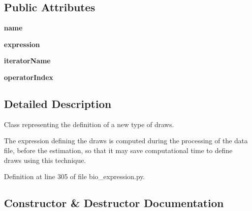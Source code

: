 \subsection*{Public Attributes}
\begin{DoxyCompactItemize}
\item 
{\bfseries name}\hypertarget{classbio__expression_1_1_define_draws_a6fbf82da29bb54a8f52993add976814d}{}\label{classbio__expression_1_1_define_draws_a6fbf82da29bb54a8f52993add976814d}

\item 
{\bfseries expression}\hypertarget{classbio__expression_1_1_define_draws_a40611dcf70a07654b7fff1fb6e52daa9}{}\label{classbio__expression_1_1_define_draws_a40611dcf70a07654b7fff1fb6e52daa9}

\item 
{\bfseries iterator\+Name}\hypertarget{classbio__expression_1_1_define_draws_af0551e32bbb64f399304bc800e2473eb}{}\label{classbio__expression_1_1_define_draws_af0551e32bbb64f399304bc800e2473eb}

\item 
{\bfseries operator\+Index}\hypertarget{classbio__expression_1_1_define_draws_afd80fd9baa3b1a7a0ed99b2e81282d4a}{}\label{classbio__expression_1_1_define_draws_afd80fd9baa3b1a7a0ed99b2e81282d4a}

\end{DoxyCompactItemize}


\subsection{Detailed Description}
Class representing the definition of a new type of draws. 

The expression defining the draws is computed during the processing of the data file, before the estimation, so that it may save computational time to define draws using this technique. 

Definition at line 305 of file bio\+\_\+expression.\+py.



\subsection{Constructor \& Destructor Documentation}
